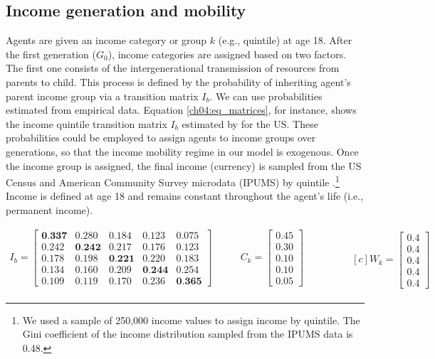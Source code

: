 \documentclass[class=article, crop=false, 12pt]{standalone}
\begin{document}
\subsection{Income generation and mobility}

Agents are given an income category or group $k$ (e.g., quintile) at age 18. After the first generation ($G_0$), income categories are assigned based on two factors. The first one consists of the intergenerational transmission of resources from parents to child. This process is defined by the probability of inheriting agent's parent income group via a transition matrix $I_{b}$. We can use probabilities estimated from empirical data. Equation \ref{ch04:eq_matrices}, for instance, shows the income quintile transition matrix $I_b$ estimated by \citet{chetty2014} for the US. These probabilities could be employed to assign agents to income groups over generations, so that the income mobility regime in our model is exogenous. Once the income group is assigned, the final income (currency) is sampled from the US Census and American Community Survey microdata (IPUMS) by quintile \citep{ruggles2020}.\footnote{We used a sample of 250,000 income values to assign income by quintile. The Gini coefficient of the income distribution sampled from the IPUMS data is 0.48.} Income is defined at age 18 and remains constant throughout the agent's life (i.e., permanent income).

\vspace{-20pt}
\begin{equation}
\label{ch04:eq_matrices}
\begin{aligned}
    I_b = 
\begin{bmatrix}
\textbf{0.337} & 0.280 & 0.184 & 0.123 & 0.075 \\
0.242 & \textbf{0.242} & 0.217 & 0.176 & 0.123 \\
0.178 & 0.198 & \textbf{0.221} & 0.220 & 0.183 \\
0.134 & 0.160 & 0.209 & \textbf{0.244} & 0.254 \\
0.109 & 0.119 & 0.170 & 0.236 & \textbf{0.365}
\end{bmatrix} \\
\end{aligned}
\qquad 
\begin{aligned}
  C_k = 
    \begin{bmatrix}
       0.45 \\
       0.30 \\
       0.10 \\
       0.10 \\
       0.05 
    \end{bmatrix} \\
\end{aligned}
\qquad \qquad
\begin{aligned}[c]
        W_k = 
        \begin{bmatrix}
       0.4 \\
       0.4 \\
       0.4 \\
       0.4 \\
       0.4 
    \end{bmatrix}
 \end{aligned}
 \end{equation}
\end{document}
